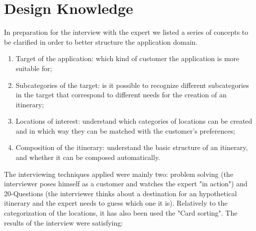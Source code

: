 \documentclass[11pt]{article} %
\renewcommand\appendix{\par
  \setcounter{section}{0}
  \setcounter{subsection}{0}
  \setcounter{figure}{0}
  \setcounter{table}{0}
  \renewcommand\thesection{Appendix \Alph{section}}
  \renewcommand\thefigure{\Alph{section}\arabic{figure}}
  \renewcommand\thetable{\Alph{section}\arabic{table}}
}
\begin{document}
\appendix
\section{Design Knowledge}

In preparation for the interview with the expert we listed a series of concepts to be clarified in order to better structure the application domain. 

\begin{enumerate}
  \item Target of the application: which kind of customer the application is more suitable for;
  \item Subcategories of the target: is it possible to recognize different subcategories in the target that correspond to different needs for the creation of an itinerary;
  \item Locations of interest: understand which categories of locations can be created and in which way they can be matched with the customer's preferences;
  \item Composition of the itinerary: understand the basic structure of an itinerary, and whether it can be composed automatically.
\end{enumerate}

The interviewing techniques applied were mainly two: problem solving (the interviewer poses himself as a customer and watches the expert "in action") and 20-Questions (the interviewer thinks about a destination for an hypothetical itinerary and the expert needs to guess which one it is). Relatively to the categorization of the locations, it has also been used the "Card sorting".
The results of the interview were satisfying:
\end{document}
